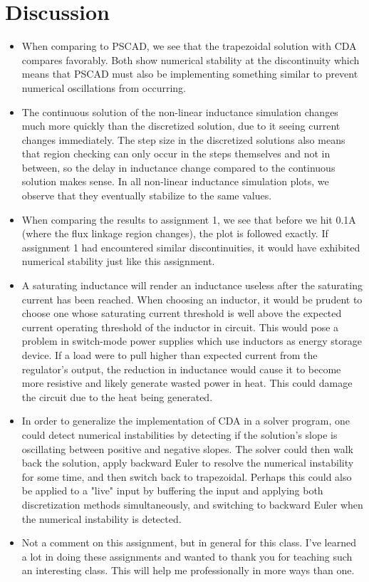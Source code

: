 \documentclass[10pt, oneside, letterpaper]{article}
\begin{document}
\newpage
\section{Discussion}

\begin{itemize}
    \item When comparing to PSCAD, we see that the trapezoidal solution with CDA compares favorably. Both show numerical stability at the discontinuity which means that PSCAD must also be implementing something similar to prevent numerical oscillations from occurring.
    \item The continuous solution of the non-linear inductance simulation changes much more quickly than the discretized solution, due to it seeing current changes immediately. The step size in the discretized solutions also means that region checking can only occur in the steps themselves and not in between, so the delay in inductance change compared to the continuous solution makes sense. In all non-linear inductance simulation plots, we observe that they eventually stabilize to the same values.
    \item When comparing the results to assignment 1, we see that before we hit 0.1A (where the flux linkage region changes), the plot is followed exactly. If assignment 1 had encountered similar discontinuities, it would have exhibited numerical stability just like this assignment.
    \item A saturating inductance will render an inductance useless after the saturating current has been reached. When choosing an inductor, it would be prudent to choose one whose saturating current threshold is well above the expected current operating threshold of the inductor in circuit. This would pose a problem in switch-mode power supplies which use inductors as energy storage device. If a load were to pull higher than expected current from the regulator's output, the reduction in inductance would cause it to become more resistive and likely generate wasted power in heat. This could damage the circuit due to the heat being generated.
    \item In order to generalize the implementation of CDA in a solver program, one could detect numerical instabilities by detecting if the solution's slope is oscillating between positive and negative slopes. The solver could then walk back the solution, apply backward Euler to resolve the numerical instability for some time, and then switch back to trapezoidal. Perhaps this could also be applied to a "live" input by buffering the input and applying both discretization methods simultaneously, and switching to backward Euler when the numerical instability is detected.
    \item Not a comment on this assignment, but in general for this class. I've learned a lot in doing these assignments and wanted to thank you for teaching such an interesting class. This will help me professionally in more ways than one.
\end{itemize}
\end{document}
